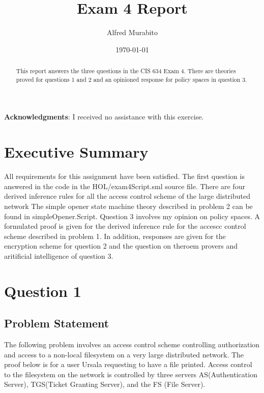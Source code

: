\documentclass[11pt, twoside]{article}
\title{Exam 4 Report}
\author{Alfred Murabito}
\date{\today}
\begin{document}
\maketitle{}

\newpage

\begin{abstract}
This report answers the three questions in the CIS 634 Exam 4. There are theories proved for questions 1 and 2 and an opinioned response
for policy spaces in question 3.
\end{abstract}

\newpage

\textbf{Acknowledgments}: I received no assistance with this exercise.

\newpage

\tableofcontents

\newpage

\section{Executive Summary}
\label{sec:executive-summary}



All requirements for this assignment have been satisfied. The 
first question is answered in the code in the HOL/exam4Script.sml
source file. There are four derived inference rules for all the access
control scheme of the large distributed network The simple opener state machine theory 
described in problem 2 can be found in simpleOpener.Script. Question
3 involves my opinion on policy spaces. A formulated proof is given for the derived inference rule
for the accescc control scheme described in problem 1. In addition, responses are given for the 
encryption scheme for question 2 and the question on theroem provers and aritificial intelligence of question 3.

\newpage

\section{Question 1}
\label{sec:question-1}

\subsection{Problem Statement}
\label{sec:problem-statement}

The following problem involves an access control scheme controlling authorization and access to a non-local filesystem
on a very large distributed network. The proof below is for a user Ursala requesting to have a file printed. Access control 
to the filesystem on the network is controlled by three servers AS(Authentication Server), TGS(Ticket Granting Server), and
the FS (File Server).
\end{document}
